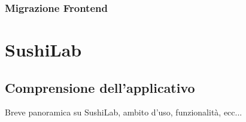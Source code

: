 \FloatBarrier
\subsubsection*{Migrazione Frontend}

\section{SushiLab}
\label{sushi-lab}
\subsection{Comprensione dell'applicativo}
Breve panoramica su SushiLab, ambito d'uso, funzionalità, ecc...
